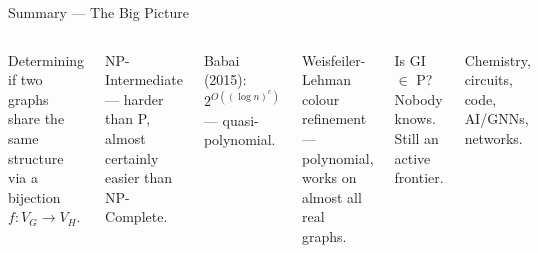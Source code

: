 \documentclass[10pt, aspectratio=169]{beamer}
\begin{document}
\begin{frame}{Summary — The \alert{Big Picture}}
	\begin{columns}[T]
		\begin{tcolorbox}[defbox, title={What is GI?}]
			Determining if two graphs share the same structure via a bijection $f: V_G \to V_H$.
		\end{tcolorbox}

		\begin{tcolorbox}[keybox, title={Where does it live?}]
			NP-Intermediate — harder than P, almost certainly easier than NP-Complete.
		\end{tcolorbox}

		\begin{tcolorbox}[greenbox, title={Best algorithm?}]
			Babai (2015): $2^{O((\log n)^c)}$ — quasi-polynomial.
		\end{tcolorbox}

		\begin{tcolorbox}[defbox, title={Practical solution?}]
			Weisfeiler-Lehman colour refinement — polynomial, works on almost all real graphs.
		\end{tcolorbox}

		\begin{tcolorbox}[redbox, title={Open question?}]
			Is GI $\in$ P? Nobody knows. Still an active frontier.
		\end{tcolorbox}

		\begin{tcolorbox}[keybox, title={Real-world uses?}]
			Chemistry, circuits, code, AI/GNNs, networks.
		\end{tcolorbox}
	\end{columns}
\end{frame}
\end{document}
